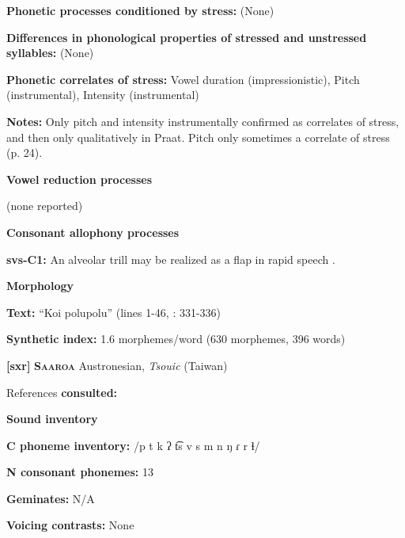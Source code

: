 \textbf{Phonetic processes conditioned by stress:} (None)



\textbf{Differences in phonological properties of stressed and unstressed syllables:} (None)



\textbf{Phonetic correlates of stress:} Vowel duration (impressionistic), Pitch (instrumental), Intensity (instrumental)



\textbf{Notes:} Only pitch and intensity instrumentally confirmed as correlates of stress, and then only qualitatively in Praat. Pitch only sometimes a correlate of stress (p. 24).



\textbf{Vowel reduction processes}



(none reported)



\textbf{Consonant allophony processes}



\textbf{svs-C1:} An alveolar trill may be realized as a flap in rapid speech \citep[17]{Wegener2010}.



\textbf{Morphology}



\textbf{Text:} “Koi polupolu” (lines 1-46, \citealt{Wegener2008}: 331-336)



\textbf{Synthetic index:} 1.6 morphemes/word (630 morphemes, 396 words)



\textbf{[sxr]}   \textbf{\textsc{Saaroa}  }  Austronesian, \textit{Tsouic} (Taiwan)



References \textbf{consulted:} \citet{Pan2012}



\textbf{Sound inventory}



\textbf{C phoneme inventory:} /p t k ʔ t͡s v s m n ŋ ɾ r ɬ/



\textbf{N consonant phonemes:} 13



\textbf{Geminates:} N/A



\textbf{Voicing contrasts:} None



